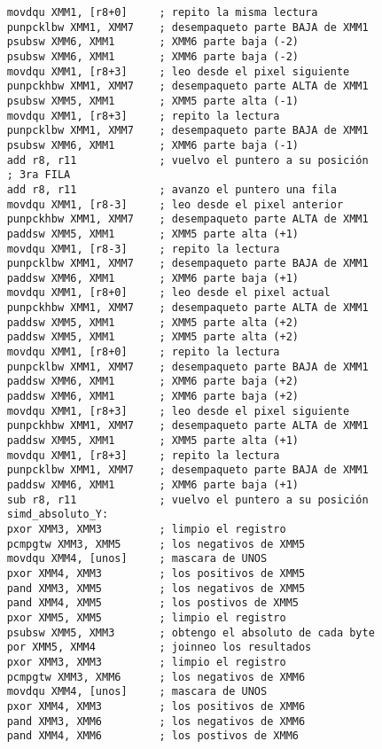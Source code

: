 \begin{verbatim}
    movdqu XMM1, [r8+0]     ; repito la misma lectura
    punpcklbw XMM1, XMM7    ; desempaqueto parte BAJA de XMM1
    psubsw XMM6, XMM1       ; XMM6 parte baja (-2)
    psubsw XMM6, XMM1       ; XMM6 parte baja (-2)
    movdqu XMM1, [r8+3]     ; leo desde el pixel siguiente
    punpckhbw XMM1, XMM7    ; desempaqueto parte ALTA de XMM1
    psubsw XMM5, XMM1       ; XMM5 parte alta (-1)
    movdqu XMM1, [r8+3]     ; repito la lectura
    punpcklbw XMM1, XMM7    ; desempaqueto parte BAJA de XMM1
    psubsw XMM6, XMM1       ; XMM6 parte baja (-1)
    add r8, r11             ; vuelvo el puntero a su posición
    ; 3ra FILA
    add r8, r11             ; avanzo el puntero una fila
    movdqu XMM1, [r8-3]     ; leo desde el pixel anterior
    punpckhbw XMM1, XMM7    ; desempaqueto parte ALTA de XMM1
    paddsw XMM5, XMM1       ; XMM5 parte alta (+1)
    movdqu XMM1, [r8-3]     ; repito la lectura
    punpcklbw XMM1, XMM7    ; desempaqueto parte BAJA de XMM1
    paddsw XMM6, XMM1       ; XMM6 parte baja (+1)
    movdqu XMM1, [r8+0]     ; leo desde el pixel actual
    punpckhbw XMM1, XMM7    ; desempaqueto parte ALTA de XMM1
    paddsw XMM5, XMM1       ; XMM5 parte alta (+2)
    paddsw XMM5, XMM1       ; XMM5 parte alta (+2)
    movdqu XMM1, [r8+0]     ; repito la lectura
    punpcklbw XMM1, XMM7    ; desempaqueto parte BAJA de XMM1
    paddsw XMM6, XMM1       ; XMM6 parte baja (+2)
    paddsw XMM6, XMM1       ; XMM6 parte baja (+2)
    movdqu XMM1, [r8+3]     ; leo desde el pixel siguiente
    punpckhbw XMM1, XMM7    ; desempaqueto parte ALTA de XMM1
    paddsw XMM5, XMM1       ; XMM5 parte alta (+1)
    movdqu XMM1, [r8+3]     ; repito la lectura
    punpcklbw XMM1, XMM7    ; desempaqueto parte BAJA de XMM1
    paddsw XMM6, XMM1       ; XMM6 parte baja (+1)
    sub r8, r11             ; vuelvo el puntero a su posición
    simd_absoluto_Y:    
    pxor XMM3, XMM3         ; limpio el registro
    pcmpgtw XMM3, XMM5      ; los negativos de XMM5
    movdqu XMM4, [unos]     ; mascara de UNOS
    pxor XMM4, XMM3         ; los positivos de XMM5
    pand XMM3, XMM5         ; los negativos de XMM5
    pand XMM4, XMM5         ; los postivos de XMM5
    pxor XMM5, XMM5         ; limpio el registro
    psubsw XMM5, XMM3       ; obtengo el absoluto de cada byte
    por XMM5, XMM4          ; joinneo los resultados
    pxor XMM3, XMM3         ; limpio el registro
    pcmpgtw XMM3, XMM6      ; los negativos de XMM6
    movdqu XMM4, [unos]     ; mascara de UNOS
    pxor XMM4, XMM3         ; los positivos de XMM6
    pand XMM3, XMM6         ; los negativos de XMM6
    pand XMM4, XMM6         ; los postivos de XMM6

\end{verbatim}
